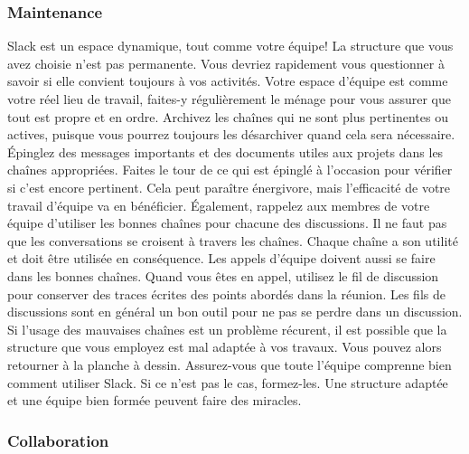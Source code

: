 \documentclass[
  letterpaper,
  DIV=11,
  numbers=noendperiod]{scrreprt}
\begin{document}
\subsubsection{Maintenance}\label{maintenance}

Slack est un espace dynamique, tout comme votre équipe! La structure que
vous avez choisie n'est pas permanente. Vous devriez rapidement vous
questionner à savoir si elle convient toujours à vos activités. Votre
espace d'équipe est comme votre réel lieu de travail, faites-y
régulièrement le ménage pour vous assurer que tout est propre et en
ordre. Archivez les chaînes qui ne sont plus pertinentes ou actives,
puisque vous pourrez toujours les désarchiver quand cela sera
nécessaire. Épinglez des messages importants et des documents utiles aux
projets dans les chaînes appropriées. Faites le tour de ce qui est
épinglé à l'occasion pour vérifier si c'est encore pertinent. Cela peut
paraître énergivore, mais l'efficacité de votre travail d'équipe va en
bénéficier. Également, rappelez aux membres de votre équipe d'utiliser
les bonnes chaînes pour chacune des discussions. Il ne faut pas que les
conversations se croisent à travers les chaînes. Chaque chaîne a son
utilité et doit être utilisée en conséquence. Les appels d'équipe
doivent aussi se faire dans les bonnes chaînes. Quand vous êtes en
appel, utilisez le fil de discussion pour conserver des traces écrites
des points abordés dans la réunion. Les fils de discussions sont en
général un bon outil pour ne pas se perdre dans un discussion. Si
l'usage des mauvaises chaînes est un problème récurent, il est possible
que la structure que vous employez est mal adaptée à vos travaux. Vous
pouvez alors retourner à la planche à dessin. Assurez-vous que toute
l'équipe comprenne bien comment utiliser Slack. Si ce n'est pas le cas,
formez-les. Une structure adaptée et une équipe bien formée peuvent
faire des miracles.

\subsubsection{Collaboration}\label{collaboration}
\end{document}

